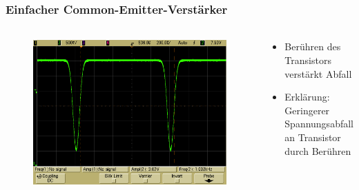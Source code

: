 \begin{frame}
    \frametitle{Einfacher Common-Emitter-Verstärker}
    \framesubtitle{}
     \begin{columns}[c]
        \begin{figure}[H]
        \begin{center}
                \includegraphics[scale=0.15]{./img/oszi/Aufgabe31_finger.png}
        \end{center}
        \end{figure}
        \begin{block}{}
            \begin{itemize}
                \item Berühren des Transistors verstärkt Abfall
                \item Erklärung: Geringerer Spannungsabfall an Transistor durch
                Berühren
            \end{itemize}
        \end{block}
     \end{columns}
\end{frame}
